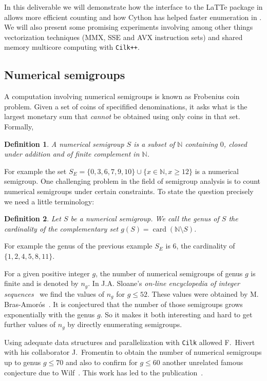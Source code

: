 \documentclass{deliverablereport}
\newcommand{\Cilk}{\texttt{Cilk}\xspace}
\newcommand{\CilkP}{\texttt{Cilk++}\xspace}
\newcommand{\NN}{\mathbb{N}}
\newtheorem{defi}{Definition}
\begin{document}
In this deliverable we will demonstrate how the interface to the LaTTe package
in \Sage allows more efficient counting and how Cython has helped faster enumeration
in \Sage. We will also present some promising experiments involving among
other things vectorization techniques (MMX, SSE and AVX instruction sets) and
shared memory multicore computing with \CilkP.

\subsection{Numerical semigroups}

A computation involving numerical semigroups is known as Frobenius coin
problem. Given a set of coins of specifified denominations, it asks what is
the largest monetary sum that {\em cannot} be obtained using only coins in that
set. Formally,
\begin{defi}
  A \emph{numerical semigroup} $S$ is a subset of $\NN$ containing $0$, closed
  under addition and of finite complement in $\NN$.
\end{defi}
For example the set $S_E=\{0,3,6,7,9,10\}\cup\{x\in\NN, x\geq 12\}$
is a numerical semigroup. One challenging problem in the field of
semigroup analysis is to count numerical semigroups under certain
constraints. To state the question precisely we need a little
terminology:
\begin{defi}
  Let $S$ be a numerical semigroup. We call the \emph{genus} of $S$ the
  cardinality of the complementary set $g(S)=\operatorname{card}(\NN\setminus
  S)$.
\end{defi}
For example the genus of the previous example $S_E$ is $6$, the cardinality of
$\{1,2,4,5,8,11\}$.

For a given positive integer $g$, the number of numerical semigroups of genus
$g$ is finite and is denoted by $n_g$. In J.A. Sloane's \emph{on-line
encyclopedia of integer sequences}~\cite{OEIS} we find the values of $n_g$
for $g\leq 52$. These values were obtained by M. Bras-Amor\'os~\cite{BrasAmoros2008}. It is conjectured that the number of
those semigroups grows exponentially with the genus $g$. So it makes it both interesting and hard
to get further values of $n_g$ by directly enumerating semigroups.

Using adequate data structures and parallelization with \Cilk allowed
F.~Hivert with his collaborator J.~Fromentin to obtain the number of numerical
semigroups up to genus $g \leq 70$ and also to confirm for $g\leq 60$ another
unrelated famous conjecture due to Wilf~\cite{Wilf}. This work has led to the
publication~\cite{FromentinH16}.
\end{document}
